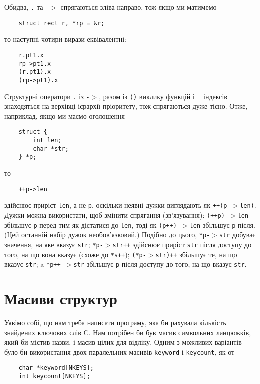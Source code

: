 \documentclass[a4paper,12pt]{book}
\begin{document}
  Обидва, \texttt{.} та \texttt{-\mbox{$>$}} спрягаються зліва направо, тож якщо ми матимемо
  \begin{verbatim}
    struct rect r, *rp = &r;
  \end{verbatim}
  то наступні чотири вирази еквівалентні:
  \begin{verbatim}
    r.pt1.x
    rp->pt1.x
    (r.pt1).x
    (rp->pt1).x
  \end{verbatim}

  Структурні оператори \texttt{.} із \texttt{-\mbox{$>$}}, разом із \texttt{()} виклику функцій
  і \texttt{\mbox{$[$}\mbox{$]$}} індексів знаходяться на верхівці ієрархії пріоритету, тож спрягаються дуже
  тісно. Отже, наприклад, якщо ми маємо оголошення
  \begin{verbatim}
    struct {
        int len;
        char *str;
    } *p;
  \end{verbatim}
  то
  \begin{verbatim}
    ++p->len
  \end{verbatim}
  здійснює приріст \texttt{len}, а не \texttt{p}, оскільки неявні дужки виглядають як
  \texttt{++(p-\mbox{$>$}len)}. Дужки можна використати, щоб змінити спрягання (зв'язування):
  \texttt{(++p)-\mbox{$>$}len} збільшує \texttt{p} перед тим як дістатися до \texttt{len}, тоді
  як \texttt{(p++)-\mbox{$>$}len} збільшує \texttt{p} після. (Цей останній набір дужок
  необов'язковий.) Подібно до цього, \texttt{*p-\mbox{$>$}str} добуває значення, на яке вказує
  \texttt{str}; \texttt{*p-\mbox{$>$}str++} здійснює приріст \texttt{str} після доступу до того,
  на що вона вказує (схоже до \texttt{*s++}); \texttt{(*p-\mbox{$>$}str)++} збільшує те, на що
  вказує \texttt{str}; a \texttt{*p++-\mbox{$>$}str} збільшує \texttt{p} після доступу до того,
  на що вказує \texttt{str}.

\section{Масиви структур}


  Уявімо собі, що нам треба написати програму, яка би рахувала кількість знайдених
  ключових слів C. Нам потрібен би був масив символьних ланцюжків, який би містив назви, і
  масив цілих для відліку. Одним з можливих варіантів було би використання двох
  паралельних масивів \texttt{keyword} і \texttt{keycount}, як от
  \begin{verbatim}
    char *keyword[NKEYS];
    int keycount[NKEYS];
  \end{verbatim}
\end{document}
